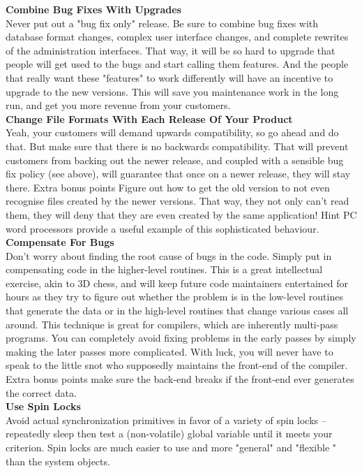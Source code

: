 \documentclass[11pt,twoside,a4paper]{article}
\begin{document}
\textbf{Combine Bug Fixes With Upgrades}~\\
Never put out a "bug fix only" release. Be sure to combine bug fixes with database format changes, complex user interface changes, and complete rewrites of the administration interfaces. That way, it will be so hard to upgrade that people will get used to the bugs and start calling them features. And the people that really want these "features" to work differently will have an incentive to upgrade to the new versions. This will save you maintenance work in the long run, and get you more revenue from your customers. ~\\

\textbf{Change File Formats With Each Release Of Your Product}~\\
Yeah, your customers will demand upwards compatibility, so go ahead and do that. But make sure that there is no backwards compatibility. That will prevent customers from backing out the newer release, and coupled with a sensible bug fix policy (see above), will guarantee that once on a newer release, they will stay there. Extra bonus points Figure out how to get the old version to not even recognise files created by the newer versions. That way, they not only can't read them, they will deny that they are even created by the same application! Hint PC word processors provide a useful example of this sophisticated behaviour. ~\\

\textbf{Compensate For Bugs}~\\
Don't worry about finding the root cause of bugs in the code. Simply put in compensating code in the higher-level routines. This is a great intellectual exercise, akin to 3D chess, and will keep future code maintainers entertained for hours as they try to figure out whether the problem is in the low-level routines that generate the data or in the high-level routines that change various cases all around. This technique is great for compilers, which are inherently multi-pass programs. You can completely avoid fixing problems in the early passes by simply making the later passes more complicated. With luck, you will never have to speak to the little snot who supposedly maintains the front-end of the compiler. Extra bonus points make sure the back-end breaks if the front-end ever generates the correct data. ~\\

\textbf{Use Spin Locks}~\\
Avoid actual synchronization primitives in favor of a variety of spin locks -- repeatedly sleep then test a (non-volatile) global variable until it meets your criterion. Spin locks are much easier to use and more "general" and "flexible " than the system objects. ~\\
\end{document}
